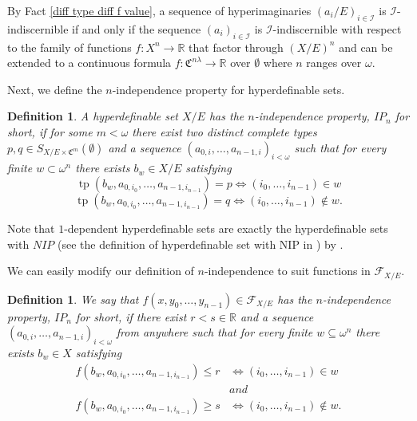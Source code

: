 \documentclass{amsart}
\newtheorem{defin}[teor]{Definition}
\newtheorem{external claim}[teor]{Claim}
\newcommand{\C}{{\mathfrak C}}
\newcommand{\R}{\mathbb{R}}
\newcommand{\I}{\mathcal{I}}
\DeclareMathOperator{\tp}{{tp}}
\begin{document}
By Fact \ref{diff type diff f value}, a sequence of hyperimaginaries $(a_i/E)_{i\in \I}$ is $\I$-indiscernible if and only if the sequence $(a_i)_{i\in \I}$ is $\I$-indiscernible with respect to the family of functions $f: X^n\to \R$ that factor through $(X/E)^n$ and can be extended to a continuous formula $f:\C^{n\lambda}\to \R$ over $\emptyset$ where $n$ ranges over $\omega$.

Next, we define the $n$-independence property for hyperdefinable sets. 

\begin{defin}\label{Definition: hyperim IP_n}
A hyperdefinable set $X/E$ has the \emph{$n$-independence property}, $IP_n$ for short, if for some $m<\omega$ there exist two distinct complete types $p,q\in S_{X/E\times \C^m}(\emptyset)$ and a sequence $(a_{0,i},\dots, a_{n-1,i})_{i< \omega}$ such that for every finite $w\subset \omega^n$ there exists $b_w\in X/E$ satisfying $$\tp(b_w, a_{0,i_0},\dots, a_{n-1,i_{n-1}}  )=p \iff (i_0,\dots, i_{n-1})\in w$$ $$\tp(b_w, a_{0,i_0},\dots, a_{n-1,i_{n-1}}  )=q \iff (i_0,\dots, i_{n-1})\notin w. $$ 
\end{defin}

Note that $1$-dependent hyperdefinable sets are exactly the hyperdefinable sets with $NIP$ (see the definition of hyperdefinable set with NIP in \cite[Remark 2.3]{HaskelPilllay}) by %
\cite[Lemma 2.12]{10.1215/00294527-2022-0023}. 


We can easily modify our definition of $n$-independence to suit functions in $\mathcal{F}_{X/E}$.

\begin{defin}\label{defin: n-dep function/E}
     We say that $f(x,y_0,\dots,y_{n-1})\in \mathcal{F}_{X/E}$ \emph{ has the $n$-independence property}, $IP_n$ for short, if there exist $r<s\in\mathbb{R}$ and a sequence $(a_{0,i},\dots, a_{n-1,i})_{i< \omega}$ from anywhere such that for every finite $w\subseteq \omega^n$ there exists $b_w\in X$ satisfying 
     \begin{align*}
         f(b_w, a_{0,i_0},\dots, a_{n-1,i_{n-1}}  )\leq r &\iff (i_0,\dots, i_{n-1})\in w\\
         &and\\
         f(b_w, a_{0,i_0},\dots, a_{n-1,i_{n-1}}  )\geq s &\iff (i_0,\dots, i_{n-1})\notin w.
     \end{align*} %
\end{defin}
\end{document}
